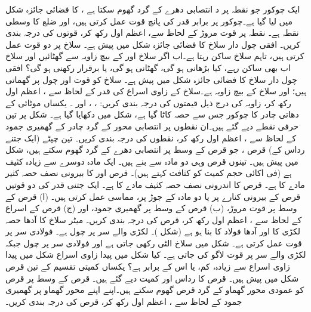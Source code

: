ایک چوکور جو نقطہ   پر د انتصابی دھرے  کے گرد  گھوم سکتا ہے ، کا فضائی جائزہ شکل  میں لیا گیا ہے۔چوکور پر برابر قدر کی پانچ قوت عمل کرتی ہیں، اور  ضلع کا وسطی نقطہ  ہے۔ نقطہ  پر قوت مروڑ   کے لحاظ سے، اعظم اول رکھ کر، قوتوں کی درجہ بندی کریں۔
افقی چول دار  سلاخ کا فضائی جائزہ   شکل  میں پیش ہے۔ سلاخ پر دو قوت عمل کرتی ہیں، تاہم سلاخ ساکن رہتا ہے۔اب  اگر سلاخ اور  کے بیچ زاویہ  سے گھٹائیں اور سلاخ اب بھی ساکن رہے، کیا  بڑھانی  ہو گی، گھٹانی ہو گی، یا برقرار رکھنی ہو گی؟
افقی چول دار  سلاخ کا فضائی جائزہ   شکل  میں پیش ہے۔ سلاخ   کو قوت  اور  چول پر    گھماتی ہیں؛  اور سلاخ کے بیچ زاویہ  ہے۔سلاخ کے زاوی اسراع کی قدر کے لحاظ سے ، اعظم اول رکھ کر، زاویہ  کی درج ذیل قیمتوں کی درجہ بندی کریں: ،  ، اور  ۔
یکساں موٹائی   کے دھاتی  چادر کا چوکور جس سے  حصہ کاٹا گیا ہے، شکل  میں دکھایا گیا ہے۔ شکل پر تین حرفی نقطے دیے گئے ہیں۔ان نقطوں پر انتصابی محور   کے گرد چادر کے گھمیری جمود کے لحاظ سے ، اعظم اول رکھ کر،  نقطوں کی درجہ بندی   کریں۔
تین چپٹے (ایک جتنے رداس کے)  قرص ، جو قرص کے وسط پر  انتصابی دھرے کے گرد گھوم سکتے ہیں، شکل  میں پیش ہیں۔ تینوں قرص  وہی   دو مادہ سے بنے ہیں۔ ایک مادہ  دوسرے سے زیادہ کثیف ہے (فی اکائی حجم کمیت کو کثافت کہتے ہیں)۔ قرص  اور  کا بیرونی نصف حصہ کثیر مادے کا ہے۔ قرص   کا اندرونی نصف حصہ کثیف مادے کا  ہے۔ ایک جتنی  قدر کی دو قوتیں قرص کے بیرونی کنارے پر یا دو مادہ   کے جوڑ پر،  مماسی عمل کرتی ہیں۔  (ا) قرص کے وسط  پر قوت مروڑ، (ب)  قرص کے وسط پر گھمیری جمود، اور (ج) قرص کے اسراع کے لحاظ سے ، اعظم اول رکھ کر، قرص کی درجہ بندی کریں۔
میٹر سلاخ کا  آدھا حصہ لکڑی کا اور آدھا  فولاد کا بنا ہو ہے (شکل )۔ لکڑی  والے سر   پر  چول ہے۔ فولادی سر  پر قوت  عمل کرتی ہے۔ شکل  میں سلاخ الٹی رکھی جاتی ہے اور  فولادی سر  پر چول  جبکہ لکڑی والے سر  پر قوت لاگو کی جاتی ہے۔ کیا شکل   میں پیدا زاوی اسراع  شکل  میں پیدا زاوی  اسراع سے زیادہ، کم، یا اس کے برابر ہے؟
یکساں کمیتی تقسیم کے تین قرص شکل  میں پیش ہیں۔ قرص کا  رداس  اور کمیت  دیے گئے ہیں۔ قرص  کے وسط پر  قرص کو عمودی محور گھماو کے گرد قرص گھوم سکتے ہیں۔اپنے اپنے  محور گھماو  پر گھمیری جمود کے لحاظ سے ، اعظم اول رکھ کر، قرص کی درجہ بندی کریں۔

